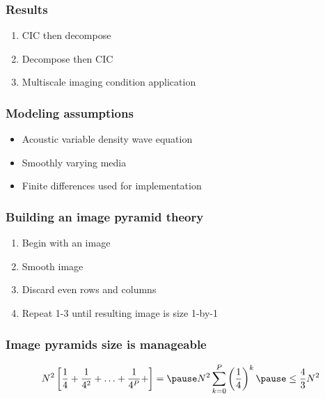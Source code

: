 \begin{frame} \frametitle{Results}
  \FontMd
  \begin{enumerate}
    \item CIC then decompose
    \vspace{0.6in}
    \item Decompose then CIC 
    \vspace{0.6in}
    \item Multiscale imaging condition application 
  \end{enumerate}
\end{frame}

\begin{frame} \frametitle{Modeling assumptions}
  \FontMd
  \begin{itemize}
    \vspace{0.6in}
    \item Acoustic variable density wave equation 
    \vspace{0.6in}
    \item Smoothly varying media
    \vspace{0.6in}
    \item Finite differences used for implementation 
  \end{itemize}
\end{frame}



\begin{frame} \frametitle{Building an image pyramid theory}
  \FontMd
  \begin{enumerate}
    \vspace{0.4in}
    \item Begin with an image 
    \vspace{0.4in}
    \item Smooth image 
    \vspace{0.4in}
    \item Discard even rows and columns 
    \vspace{0.4in}
    \item Repeat 1-3 until resulting image is size 1-by-1 
  \end{enumerate}
\end{frame}

\begin{frame} \frametitle{Image pyramids size is manageable}
  \begin{equation}
  N^2\left[\dfrac{1}{4}+\dfrac{1}{4^2}+\hdots+\dfrac{1}{4^P}+\right] = \pause N^2\sum_{k=0}^{P} \left(\dfrac{1}{4}\right)^k \pause \leq \dfrac{4}{3}N^2
  \end{equation}
\end{frame}


